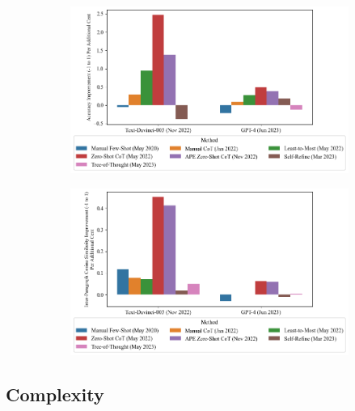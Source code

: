\documentclass[11pt]{article}
\begin{document}
\begin{figure}
  \caption{Gains Per Cent v. Direct Prompting}
  \begin{subfigure}[h]{0.4925\textwidth}
      \centering
      \includegraphics[width=0.95\hsize]{../Output/gsm8k_change_in_accuracy_quality_per_change_in_cost_sorted_by_technique_age.png} 
  \end{subfigure}
  \begin{subfigure}[h]{0.4925\textwidth}
      \centering
      \includegraphics[width=0.95\hsize]{../Output/cw_change_in_accuracy_quality_per_change_in_cost_sorted_by_technique_age_transformed.png}
  \end{subfigure}
  \hfill
  \label{fig:gains_v_dp_cost}
\end{figure}

\subsection*{Complexity}
\end{document}
